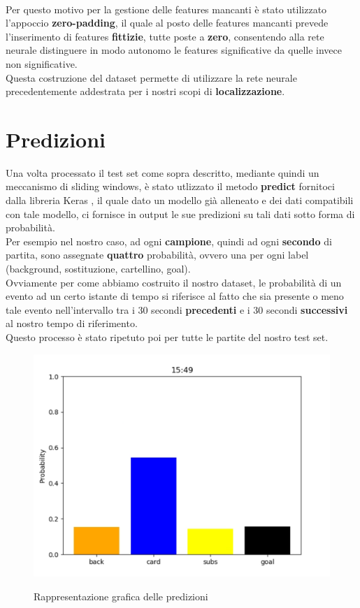 \\Per questo motivo per la gestione delle features mancanti è stato utilizzato l'appoccio \textbf{zero-padding}, il quale al posto delle features mancanti prevede l'inserimento di features \textbf{fittizie}, tutte poste a \textbf{zero}, consentendo alla rete neurale distinguere in modo autonomo le features significative da quelle invece non significative.
\\Questa costruzione del dataset permette di utilizzare la rete neurale precedentemente addestrata per i nostri scopi di \textbf{localizzazione}.
\section{Predizioni}
Una volta processato il test set come sopra descritto, mediante quindi un meccanismo di sliding windows, è stato utlizzato il metodo \textbf{predict} fornitoci dalla libreria Keras \cite{chollet2015keras}, il quale dato un modello già alleneato e dei dati compatibili con tale modello, ci fornisce in output le sue predizioni su tali dati sotto forma di probabilità. 
\\Per esempio nel nostro caso, ad ogni \textbf{campione}, quindi ad ogni \textbf{secondo} di partita, sono assegnate \textbf{quattro} probabilità, ovvero una per ogni label (background, sostituzione, cartellino, goal).
\\Ovviamente per come abbiamo costruito il nostro dataset, le probabilità di un evento ad un certo istante di tempo si riferisce al fatto che sia presente o meno tale evento nell'intervallo tra i 30 secondi \textbf{precedenti} e i 30 secondi \textbf{successivi} al nostro tempo di riferimento.
\\Questo processo è stato ripetuto poi per tutte le partite del nostro test set.
\begin{figure}[H]
\centering
\caption{Rappresentazione grafica delle predizioni}
\includegraphics[scale=0.22]{img/predict.png}
\label{figure : predict}
\end{figure}
